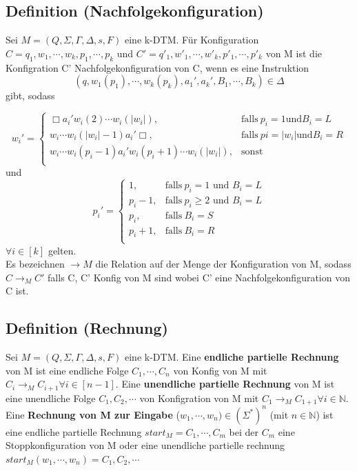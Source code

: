 \documentclass[a4paper,11pt]{article}
\begin{document}
\subsection{Definition (Nachfolgekonfiguration)} 
\begin{sloppypar}
  Sei $M = (Q, \Sigma, \Gamma, \Delta, s, F)$ eine k-DTM. Für Konfiguration $C = q_{1}, w_{1}, \cdots, w_{k}, p_{1},\cdots, p_{k}$ und $C' = q'_{1}, w'_{1}, \cdots, w'_{k}, p'_{1},\cdots, p'_{k}$ von M ist die Konfigration C' Nachfolgekonfiguration von C, wenn es eine Instruktion \[(q, w_{1}(p_{1}), \cdots, w_{k}(p_{k}), a_{1}', a_{k}', B_{1}, \cdots, B_{k}) \in \Delta\] gibt, sodass 
\end{sloppypar}
\begin{equation*}
  w_{i}' = 
  \begin{cases}
    \Box a_{i}' w_{i}(2) \cdots w_{i}(|w_{i}|), & \text{falls}\ p_{i} = 1 \text{und}  B_{i} = L \\
    w_{i} \cdots w_{i}(|w_{i}| - 1) a_{i}' \Box, & \text{falls}\ p{i} = |w_{i}| \text{und} B_{i} = R \\
    w_{i} \cdots w_{i}(p_{i}-1) a_{i}' w_{i}(p_{i} + 1) \cdots w_{i}(|w_{i}|), & \text{sonst} \\
  \end{cases}
\end{equation*}
und 
\begin{equation*}
  p_{i}' = 
  \begin{cases}
    1, & \text{falls}\ p_{i} = 1 \text{ und } B_{i} = L\\
    p_{i} - 1, & \text{falls}\ p_{i} \geq 2 \text{ und } B_{i} = L\\
    p_{i}, & \text{falls}\ B_{i} = S\\
    p_{i} + 1, & \text{falls}\ B_{i} = R\\
  \end{cases}
\end{equation*}
$\forall i \in [k]$ gelten. \\ Es bezeichnen $\rightarrow M$ die Relation auf der Menge der Konfiguration von M, sodass $C \rightarrow_{M} C'$ falls C, C' Konfig von M sind wobei C' eine Nachfolgekonfiguration von C ist.

\subsection{Definition (Rechnung)} Sei $M = (Q, \Sigma, \Gamma, \Delta, s, F)$ eine k-DTM. Eine \textbf{endliche partielle Rechnung} von M ist eine endliche Folge $C_{1}, \cdots, C_{n}$ von Konfig von M mit $C_{i} \rightarrow_{M} C_{i+1} \forall i \in [n-1]$. Eine \textbf{unendliche partielle Rechnung} von M ist eine unendliche Folge $C_{1}, C_{2}, \cdots$ von Konfigration von M mit $C_{1} \rightarrow_{M} C_{1+1} \forall i \in \mathbb{N}$. Eine \textbf{Rechnung von M zur Eingabe } ($w_{1}, \cdots
, w_{n}) \in (\Sigma^*)^n$ (mit $n \in \mathbb{N}$) ist eine endliche partielle Rechnung $start_M = C_1, \cdots, C_m$ bei der $C_m$ eine Stoppkonfiguration von M oder eine unendliche partielle rechnung $start_M(w_1, \cdots, w_n) = C_1, C_2, \cdots$
\end{document}
